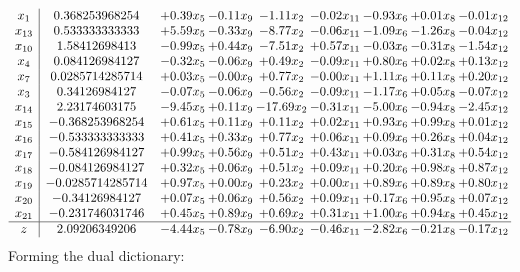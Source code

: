 \documentclass[8pt]{article}
\begin{document}
\[\begin{array}{c| c c@{\hskip 2pt} c@{\hskip 2pt} c@{\hskip 2pt} c@{\hskip 2pt} c@{\hskip 2pt} c@{\hskip 2pt} c@{\hskip 2pt} }
 x_{1}   &  0.368253968254 & +  0.39 x_{5} & -0.11 x_{9} & -1.11 x_{2} & -0.02 x_{11} & -0.93 x_{6} & +  0.01 x_{8} & -0.01 x_{12}\\
 x_{13}   &  0.533333333333 & +  5.59 x_{5} & -0.33 x_{9} & -8.77 x_{2} & -0.06 x_{11} & -1.09 x_{6} & -1.26 x_{8} & -0.04 x_{12}\\
 x_{10}   &  1.58412698413 & -0.99 x_{5} & +  0.44 x_{9} & -7.51 x_{2} & +  0.57 x_{11} & -0.03 x_{6} & -0.31 x_{8} & -1.54 x_{12}\\
 x_{4}   &  0.084126984127 & -0.32 x_{5} & -0.06 x_{9} & +  0.49 x_{2} & -0.09 x_{11} & +  0.80 x_{6} & +  0.02 x_{8} & +  0.13 x_{12}\\
 x_{7}   &  0.0285714285714 & +  0.03 x_{5} & -0.00 x_{9} & +  0.77 x_{2} & -0.00 x_{11} & +  1.11 x_{6} & +  0.11 x_{8} & +  0.20 x_{12}\\
 x_{3}   &  0.34126984127 & -0.07 x_{5} & -0.06 x_{9} & -0.56 x_{2} & -0.09 x_{11} & -1.17 x_{6} & +  0.05 x_{8} & -0.07 x_{12}\\
 x_{14}   &  2.23174603175 & -9.45 x_{5} & +  0.11 x_{9} & -17.69 x_{2} & -0.31 x_{11} & -5.00 x_{6} & -0.94 x_{8} & -2.45 x_{12}\\
 x_{15}   &  -0.368253968254 & +  0.61 x_{5} & +  0.11 x_{9} & +  0.11 x_{2} & +  0.02 x_{11} & +  0.93 x_{6} & +  0.99 x_{8} & +  0.01 x_{12}\\
 x_{16}   &  -0.533333333333 & +  0.41 x_{5} & +  0.33 x_{9} & +  0.77 x_{2} & +  0.06 x_{11} & +  0.09 x_{6} & +  0.26 x_{8} & +  0.04 x_{12}\\
 x_{17}   &  -0.584126984127 & +  0.99 x_{5} & +  0.56 x_{9} & +  0.51 x_{2} & +  0.43 x_{11} & +  0.03 x_{6} & +  0.31 x_{8} & +  0.54 x_{12}\\
 x_{18}   &  -0.084126984127 & +  0.32 x_{5} & +  0.06 x_{9} & +  0.51 x_{2} & +  0.09 x_{11} & +  0.20 x_{6} & +  0.98 x_{8} & +  0.87 x_{12}\\
 x_{19}   &  -0.0285714285714 & +  0.97 x_{5} & +  0.00 x_{9} & +  0.23 x_{2} & +  0.00 x_{11} & +  0.89 x_{6} & +  0.89 x_{8} & +  0.80 x_{12}\\
 x_{20}   &  -0.34126984127 & +  0.07 x_{5} & +  0.06 x_{9} & +  0.56 x_{2} & +  0.09 x_{11} & +  0.17 x_{6} & +  0.95 x_{8} & +  0.07 x_{12}\\
 x_{21}   &  -0.231746031746 & +  0.45 x_{5} & +  0.89 x_{9} & +  0.69 x_{2} & +  0.31 x_{11} & +  1.00 x_{6} & +  0.94 x_{8} & +  0.45 x_{12}\\
\hline
z    &  2.09206349206 & -4.44 x_{5} & -0.78 x_{9} & -6.90 x_{2} & -0.46 x_{11} & -2.82 x_{6} & -0.21 x_{8} & -0.17 x_{12}\\
\end{array}\]
Forming the dual dictionary:
\end{document}
